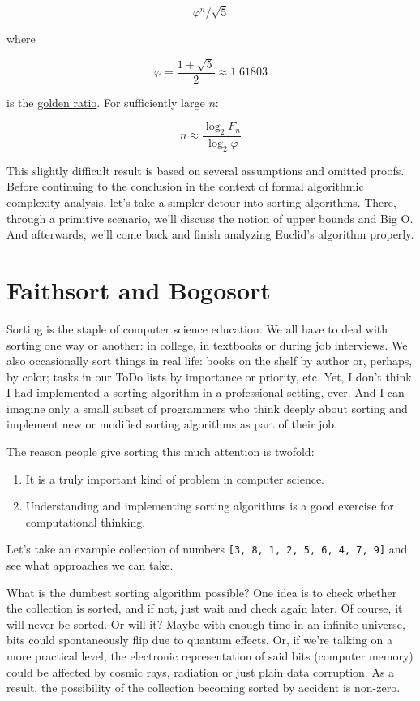 \documentclass[a4paper, justified, notitlepage, sfsidenotes, notoc]{tufte-book}
\begin{document}
$$\varphi ^{n}/{\sqrt {5}}$$

where

$$\varphi=\frac {1+\sqrt {5}}{2} \approx 1.61803$$

is the \href{https://en.wikipedia.org/wiki/Golden\_ratio}{golden ratio}. For sufficiently large \(n\):

$$n \approx \frac { \log_{2} F_n}{\log_{2} \varphi}$$

This slightly difficult result is based on several assumptions and omitted proofs. Before continuing to the conclusion in the context of formal algorithmic complexity analysis, let's take a simpler detour into sorting algorithms. There, through a primitive scenario, we'll discuss the notion of upper bounds and Big O. And afterwards, we'll come back and finish analyzing Euclid's algorithm properly.
\chapter{Faithsort and Bogosort}
\label{sec:org6820219}

Sorting is the staple of computer science education. We all have to deal with sorting one way or another: in college, in textbooks or during job interviews. We also occasionally sort things in real life: books on the shelf by author or, perhaps, by color; tasks in our ToDo lists by importance or priority, etc. Yet, I don't think I had implemented a sorting algorithm in a professional setting, ever. And I can imagine only a small subset of programmers who think deeply about sorting and implement new or modified sorting algorithms as part of their job.

The reason people give sorting this much attention is twofold:

\begin{enumerate}
\item It is a truly important kind of problem in computer science.
\item Understanding and implementing sorting algorithms is a good exercise for computational thinking.
\end{enumerate}

Let's take an example collection of numbers \texttt{[3, 8, 1, 2, 5, 6, 4, 7, 9]} and see what approaches we can take.

What is the dumbest sorting algorithm possible? One idea is to check whether the collection is sorted, and if not, just wait and check again later. Of course, it will never be sorted. Or will it? Maybe with enough time in an infinite universe, bits could spontaneously flip due to quantum effects. Or, if we're talking on a more practical level, the electronic representation of said bits (computer memory) could be affected by cosmic rays, radiation or just plain data corruption. As a result, the possibility of the collection becoming sorted by accident is non-zero.
\end{document}
